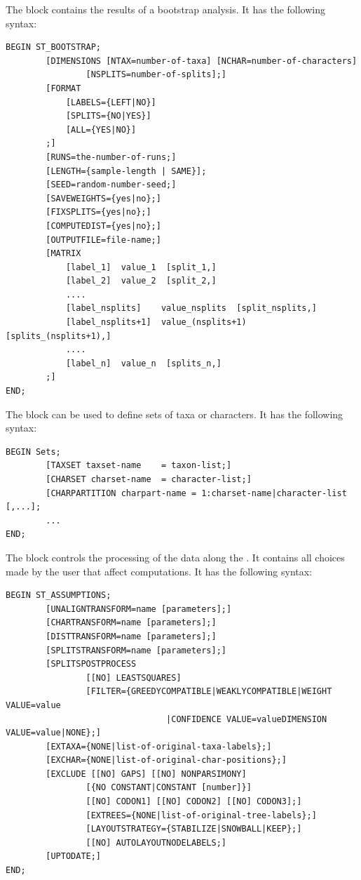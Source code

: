 \documentclass[11pt]{article}
\begin{document}

The  block contains the results of a bootstrap analysis.
It has the following syntax:
\begin{verbatim}
BEGIN ST_BOOTSTRAP;
        [DIMENSIONS [NTAX=number-of-taxa] [NCHAR=number-of-characters]
                [NSPLITS=number-of-splits];]
        [FORMAT
            [LABELS={LEFT|NO}]
            [SPLITS={NO|YES}]
            [ALL={YES|NO}]
        ;]
        [RUNS=the-number-of-runs;]
        [LENGTH={sample-length | SAME}];
        [SEED=random-number-seed;]
        [SAVEWEIGHTS={yes|no};]
        [FIXSPLITS={yes|no};]
        [COMPUTEDIST={yes|no};]
        [OUTPUTFILE=file-name;]
        [MATRIX
            [label_1]  value_1  [split_1,]
            [label_2]  value_2  [split_2,]
            ....
            [label_nsplits]    value_nsplits  [split_nsplits,]
            [label_nsplits+1]  value_(nsplits+1)  [splits_(nsplits+1),]
            ....
            [label_n]  value_n  [splits_n,]
        ;]
END;
\end{verbatim}


The  block can be used to define sets of taxa or characters.
It has the following syntax:

\begin{verbatim}
BEGIN Sets;
        [TAXSET taxset-name    = taxon-list;]
        [CHARSET charset-name  = character-list;]
        [CHARPARTITION charpart-name = 1:charset-name|character-list [,...];
        ...
END;
\end{verbatim}


The  block controls the processing of the data along
the . It contains all choices made by the user that affect
computations.
It has the following syntax:

\begin{verbatim}
BEGIN ST_ASSUMPTIONS;
        [UNALIGNTRANSFORM=name [parameters];]
        [CHARTRANSFORM=name [parameters];]
        [DISTTRANSFORM=name [parameters];]
        [SPLITSTRANSFORM=name [parameters];]
        [SPLITSPOSTPROCESS
                [[NO] LEASTSQUARES]
                [FILTER={GREEDYCOMPATIBLE|WEAKLYCOMPATIBLE|WEIGHT VALUE=value
                                |CONFIDENCE VALUE=valueDIMENSION VALUE=value|NONE};]
        [EXTAXA={NONE|list-of-original-taxa-labels};]
        [EXCHAR={NONE|list-of-original-char-positions};]
        [EXCLUDE [[NO] GAPS] [[NO] NONPARSIMONY]
                [{NO CONSTANT|CONSTANT [number]}]
                [[NO] CODON1] [[NO] CODON2] [[NO] CODON3];]
                [EXTREES={NONE|list-of-original-tree-labels};]
                [LAYOUTSTRATEGY={STABILIZE|SNOWBALL|KEEP};]
                [[NO] AUTOLAYOUTNODELABELS;]
        [UPTODATE;]
END;
\end{verbatim}
\end{document}
